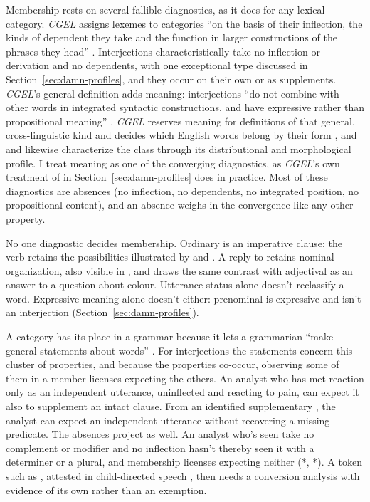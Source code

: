 \documentclass[12pt]{article}
\begin{document}
Membership rests on several fallible diagnostics, as it does for any
lexical category. \textit{CGEL} assigns lexemes to categories \enquote{on
the basis of their inflection, the kinds of dependent they take and the
function in larger constructions of the phrases they head}
\citep[30]{HuddlestonPullum2002}. Interjections characteristically take no
inflection or derivation \citep[106]{ameka1992} and no dependents, with one
exceptional type discussed in Section~\ref{sec:damn-profiles}, and they
occur on their own or as supplements. \textit{CGEL}'s general definition adds meaning:
interjections \enquote{do not combine with other words in integrated
syntactic constructions, and have expressive rather than propositional
meaning} \citep[1361]{HuddlestonPullum2002}. \textit{CGEL} reserves meaning
for definitions of that general, cross-linguistic kind and decides which
English words belong by their form \citep[31--32]{HuddlestonPullum2002},
and \textcite[105--106]{ameka1992} and \textcite[124--125]{wilkins1992}
likewise characterize the class through its distributional and
morphological profile. I treat meaning as one of the converging diagnostics,
as \textit{CGEL}'s own treatment of  in
Section~\ref{sec:damn-profiles} does in practice. Most of these diagnostics
are absences (no inflection, no dependents, no integrated position, no
propositional content), and an absence weighs in the convergence like any
other property.

No one diagnostic decides membership. Ordinary  is an
imperative clause: the verb retains the possibilities illustrated by
 and . A reply 
to  retains nominal organization, also
visible in , and \textcite[124--125]{wilkins1992}
draws the same contrast with adjectival  as an answer to a
question about colour. Utterance status alone doesn't reclassify a word.
Expressive meaning alone doesn't either: prenominal  is
expressive and isn't an interjection (Section~\ref{sec:damn-profiles}).

A category has its place in a grammar because it lets a grammarian
\enquote{make general statements about words} \citep[30]{HuddlestonPullum2002}.
For interjections the statements concern this cluster of properties, and
because the properties co-occur, observing some of them in a member
licenses expecting the others. An analyst who has met reaction
 only as an independent utterance, uninflected and reacting
to pain, can expect it also to supplement an intact clause. From an
identified supplementary , the analyst can expect an
independent utterance without recovering a missing predicate. The
absences project as well. An analyst who's seen  take no
complement or modifier and no inflection hasn't thereby seen it with a
determiner or a plural, and membership licenses expecting neither
(*, *). A token such as
, attested in child-directed speech
\citep[36]{stange2016}, then needs a conversion analysis with evidence of
its own rather than an exemption.
\end{document}
